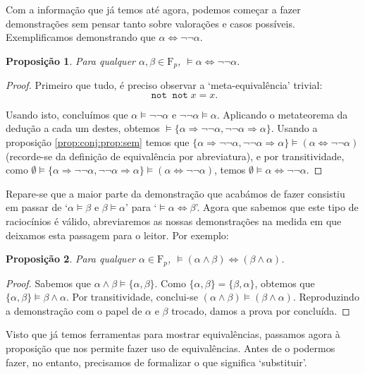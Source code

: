 \documentclass{report}
\newtheorem{prop}{Proposição}
\theoremstyle{definition}
\theoremstyle{remark}
\newcommand{\F}{\mathrm{F}}
\DeclareMathOperator{\pnot}{\texttt{not}}
\newcommand{\imply}{\mathbin{\Rightarrow}}
\newcommand{\eqv}{\mathbin{\Leftrightarrow}}
\begin{document}
	Com a informação que já temos até agora, podemos começar a fazer demonstrações sem pensar tanto sobre valorações e casos possíveis. Exemplificamos demonstrando que $\alpha \eqv \neg \neg \alpha$.
	
	\begin{prop}\label{alphaeqvnegnegalpha}
	Para qualquer $\alpha, \beta \in \F_p$, $\vDash \alpha \eqv \neg \neg \alpha$.
	\end{prop}
	
	\begin{proof}
	Primeiro que tudo, é preciso observar a `meta-equivalência' trivial:
	\[\pnot \pnot x = x.\]
	
	Usando isto, concluímos que $\alpha \vDash \neg \neg \alpha$ e $\neg \neg \alpha \vDash \alpha$. Aplicando o metateorema da dedução a cada um destes, obtemos $\vDash \{\alpha \imply \neg \neg \alpha, \neg \neg \alpha \imply \alpha\}$. Usando a proposição \ref{prop:conj:prop:sem}  temos que $\{\alpha \imply \neg \neg \alpha, \neg \neg \alpha \imply \alpha\} \vDash (\alpha \eqv \neg \neg \alpha)$ (recorde-se da definição de equivalência por abreviatura), e por transitividade, como $\emptyset \vDash \{\alpha \imply \neg \neg \alpha, \neg \neg \alpha \imply \alpha\} \vDash (\alpha \eqv \neg \neg \alpha)$, temos $\emptyset \vDash \alpha \eqv \neg \neg \alpha$.
	\end{proof}
	
	Repare-se que a maior parte da demonstração que acabámos de fazer consistiu em passar de `$\alpha \vDash \beta$ e $\beta \vDash \alpha$' para `$\vDash \alpha \eqv \beta$'. Agora que sabemos que este tipo de raciocínios é válido, abreviaremos as nossas demonstrações na medida em que deixamos esta passagem para o leitor. Por exemplo:
	
	\begin{prop}
	Para qualquer $\alpha \in \F_p$, $\vDash (\alpha \land \beta) \eqv (\beta \land \alpha)$.
	\end{prop}
	
	\begin{proof}
	Sabemos que $\alpha \land \beta \vDash \{\alpha, \beta\}$. Como $\{\alpha, \beta\} = \{\beta, \alpha\}$, obtemos que $\{\alpha, \beta\} \vDash \beta \land \alpha$. Por transitividade, conclui-se $(\alpha \land \beta) \vDash (\beta \land \alpha)$. Reproduzindo a demonstração com o papel de $\alpha$ e $\beta$ trocado, damos a prova por concluída.
	\end{proof}
	
	Visto que já temos ferramentas para mostrar equivalências, passamos agora à proposição que nos permite fazer uso de equivalências. Antes de o podermos fazer, no entanto, precisamos de formalizar o que significa `substituir'.
	
\end{document}
